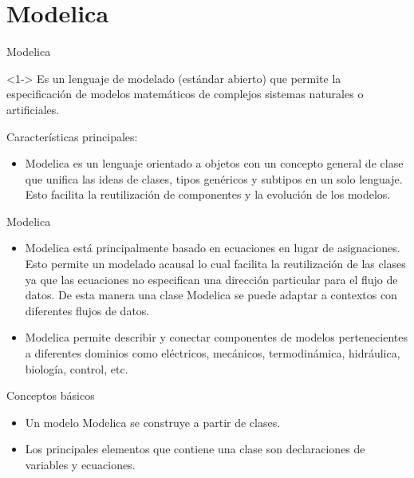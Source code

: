 \section{Modelica}

\begin{frame}{Modelica}
    \begin{block}<1->{}
        Es un lenguaje de modelado (estándar abierto) que permite la especificación de modelos matemáticos de complejos sistemas naturales o artificiales.
    \end{block}
    Características principales:
    \begin{itemize}
        \item<2-> Modelica es un lenguaje orientado a objetos con un concepto general de clase que unifica las ideas de clases, tipos genéricos y subtipos en un solo lenguaje. Esto facilita la reutilización de componentes y la evolución de los modelos. 
    \end{itemize}
\end{frame}

\begin{frame}{Modelica}
    \begin{itemize}
        \item<1-> Modelica está principalmente basado en ecuaciones en lugar de asignaciones. Esto permite un modelado acausal lo cual facilita la reutilización de las clases ya que las ecuaciones no especifican una dirección particular para el flujo de datos. De esta manera una clase Modelica se puede adaptar a contextos con diferentes flujos de datos.
        \item<2-> Modelica permite describir y conectar componentes de modelos pertenecientes a diferentes dominios como eléctricos, mecánicos, termodinámica, hidráulica, biología, control, etc. 
    \end{itemize}
\end{frame}

\begin{frame}{Conceptos básicos}
    \begin{itemize}
        \item<1-> Un modelo Modelica se construye a partir de clases.
        \item<2-> Los principales elementos que contiene una clase  son declaraciones de variables y ecuaciones.
    \end{itemize}
\end{frame}

